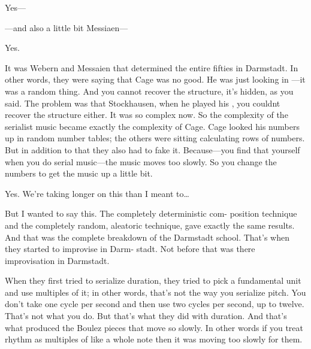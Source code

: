  Yes--- 

 ---and also a little bit Messiaen--- 

 Yes. 

 It was Webern and Messaien that determined the entire 
fifties in Darmstadt. In other words, they were saying that Cage was no 
good. He was just looking in ---it was a random thing. And you 
cannot recover the structure, it's hidden, as you said. The problem was 
that Stockhausen, when he played his , you couldnt 
recover the structure either. It was so complex now. So the complexity 
of the serialist music became exactly the complexity of Cage. Cage 
looked his numbers up in random number tables; the others were 
sitting calculating rows of numbers. But in addition to that they also 
had to fake it. Because---you find that yourself when you do serial 
music---the music moves too slowly. So you change the numbers to get 
the music up a little bit. 

 Yes. We're taking longer on this than I meant to\ldots

 But I wanted to say this. The completely deterministic com- 
position technique and the completely random, aleatoric technique, 
gave exactly the same results. And that was the complete breakdown of 
the Darmstadt school. That's when they started to improvise in Darm- 
stadt. Not before that was there improvisation in Darmstadt. 

 When they first tried to serialize duration, they tried to pick a 
fundamental unit and use multiples of it; in other words, that's not the 
way you serialize pitch. You don't take one cycle per second and then 
use two cycles per second, up to twelve. That's not what you do. But 
that's what they did with duration. And that's what produced the 
Boulez pieces that move so slowly. In other words if you treat rhythm as 
multiples of like a whole note then it was moving too slowly for them. 

